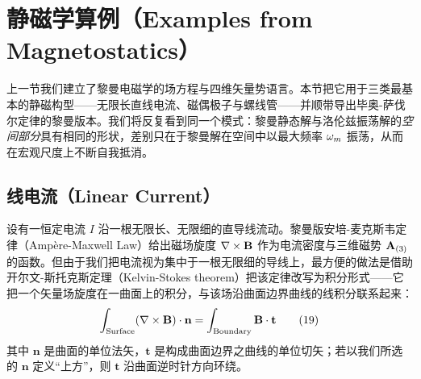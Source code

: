 \section{静磁学算例（Examples from Magnetostatics）}

上一节我们建立了黎曼电磁学的场方程与四维矢量势语言。本节把它用于三类最基本的静磁构型——无限长直线电流、磁偶极子与螺线管——并顺带导出毕奥-萨伐尔定律的黎曼版本。我们将反复看到同一个模式：黎曼静态解与洛伦兹振荡解的\emph{空间部分}具有相同的形状，差别只在于黎曼解在空间中以最大频率 $\omega_m$ 振荡，从而在宏观尺度上不断自我抵消。

\subsection{线电流（Linear Current）}

设有一恒定电流 $I$ 沿一根无限长、无限细的直导线流动。黎曼版安培-麦克斯韦定律（Ampère-Maxwell Law）给出磁场旋度 $\nabla\times\mathbf{B}$ 作为电流密度与三维磁势 $\mathbf{A}_{(3)}$ 的函数。但由于我们把电流视为集中于一根无限细的导线上，最方便的做法是借助开尔文-斯托克斯定理（Kelvin-Stokes theorem）把该定律改写为积分形式——它把一个矢量场旋度在一曲面上的积分，与该场沿曲面边界曲线的线积分联系起来：
\begin{equation}
\int_{\text{Surface}} (\nabla \times \mathbf{B})\cdot\mathbf{n} = \int_{\text{Boundary}} \mathbf{B}\cdot\mathbf{t} \tag{19}
\end{equation}
其中 $\mathbf{n}$ 是曲面的单位法矢，$\mathbf{t}$ 是构成曲面边界之曲线的单位切矢；若以我们所选的 $\mathbf{n}$ 定义“上方”，则 $\mathbf{t}$ 沿曲面逆时针方向环绕。

